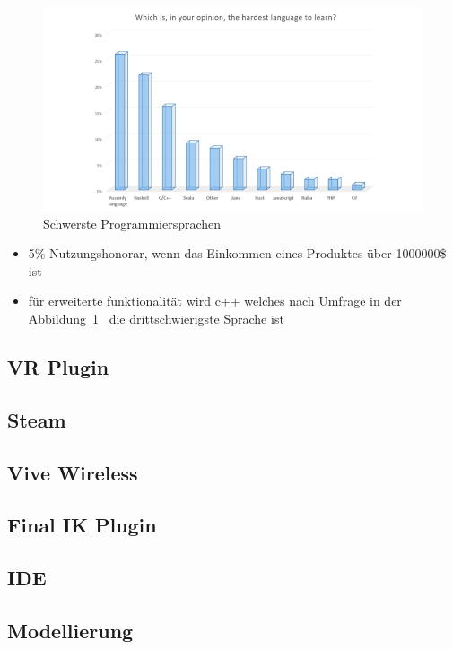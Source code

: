 \begin{figure}
    \includegraphics[scale=0.5]{pics/programming_languages_hardest}
    \caption{Schwerste Programmiersprachen}
    \label{fig:hardest_programming_languages}
\end{figure}

\begin{itemize}
    \item 5\% Nutzungshonorar, wenn das Einkommen eines Produktes über 1000000\$ ist
    \item für erweiterte funktionalität wird c++ welches nach Umfrage in der Abbildung~\ref{fig:hardest_programming_languages}~\cite{JAXCENTER_2018} die drittschwierigste Sprache ist
\end{itemize}

\subsection{VR Plugin}
\lipsum[5-12]

\subsection{Steam}
\lipsum[5-12]

\subsection{Vive Wireless}
\lipsum[5-12]

\subsection{Final IK Plugin}
\lipsum[5-12]

\subsection{IDE}
\lipsum[5-12]

\subsection{Modellierung}
\lipsum[5-12]
